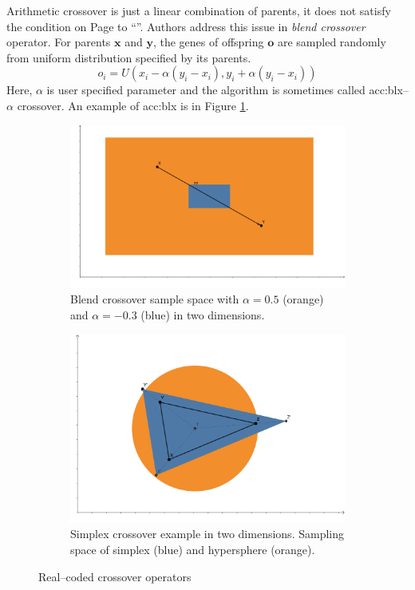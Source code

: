 Arithmetic crossover is just a linear combination of parents, it does not satisfy the condition on Page \pageref{enum:espopulationvariance} to \enquote{\snipescondition}. Authors \citet{BlendCrossoverOriginal} address this issue in \emph{blend crossover} operator. For parents $\mathbf{x}$ and $\mathbf{y}$, the genes of offspring $\mathbf{o}$ are sampled randomly from uniform distribution specified by its parents.
$$
o_i = U\left( 
    x_i - \alpha \left( y_i - x_i \right),
    y_i + \alpha \left( y_i - x_i \right)
\right)
$$
Here, $\alpha$ is user specified parameter and the algorithm is sometimes called \acrshort{acc:blx}--$\alpha$ crossover. An example of \acrshort{acc:blx} is in Figure \ref{fig:blendcrossoverexample}.

\begin{figure}
    \begin{subfigure}[t]{0.45\textwidth}
        \includegraphics[width=\textwidth]{img/BLX.pdf}
        \caption{Blend crossover sample space with $\alpha=0.5$ (orange) and $\alpha=-0.3$ (blue) in two dimensions.}
        \label{fig:blendcrossoverexample}
    \end{subfigure}
    \hfill
    \begin{subfigure}[t]{0.45\textwidth}
        \includegraphics[width=\textwidth]{img/SimplexCrossover.pdf}
        \caption{Simplex crossover example in two dimensions. Sampling space of simplex (blue) and hypersphere (orange).}
        \label{fig:simplexcrossoverexample}
    \end{subfigure}
    \caption{Real--coded crossover operators}
\end{figure}

